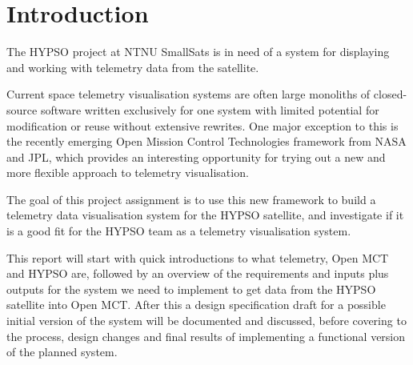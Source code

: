 \begin{comment}
Background
 - Smallsats
 - Mission planning and execution
 - Current telemetry display solutions
   - Large custom-made software suites, single-purpose - large time requirements for implementation and change

Motivation
 - NTNU SmallSat/HYPSO
 - Spacecraft telemetry
 - How should one display and process telemetry?
 - Why Open MCT works for this
   - Open framework, used by NASA on multiple projects; one of the few frameworks of its type that’s available to the public
   -Wanted to implement a well-documented and expandable solution for this; Open MCT has few existing implementations, as it is a fairly new framework - largely minor modifications of the tutorial
\end{comment}

\section{Introduction}

The HYPSO project at NTNU SmallSats is in need of a system for displaying and working with telemetry data from the satellite.

Current space telemetry visualisation systems are often large monoliths of closed-source software written exclusively for one system with limited potential for modification or reuse without extensive rewrites. One major exception to this is the recently emerging Open Mission Control Technologies framework from NASA and JPL, which provides an interesting opportunity for trying out a new and more flexible approach to telemetry visualisation.

The goal of this project assignment is to use this new framework to build a telemetry data visualisation system for the HYPSO satellite, and investigate if it is a good fit for the HYPSO team as a telemetry visualisation system.

This report will start with quick introductions to what telemetry, Open MCT and HYPSO are, followed by an overview of the requirements and inputs plus outputs for the system we need to implement to get data from the HYPSO satellite into Open MCT. After this a design specification draft for a possible initial version of the system will be documented and discussed, before covering to the process, design changes and final results of implementing a functional version of the planned system.


